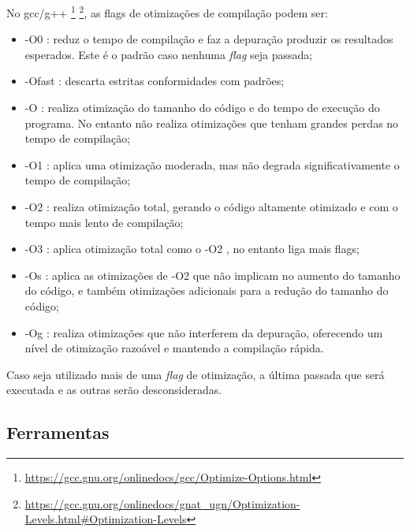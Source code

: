No gcc/g++
\footnote{\url{https://gcc.gnu.org/onlinedocs/gcc/Optimize-Options.html}}
\footnote{\url{https://gcc.gnu.org/onlinedocs/gnat\_ugn/Optimization-Levels.html\#Optimization-Levels}},
 as flags de otimizações de compilação podem ser:

\begin{itemize}
	\item -O0 : reduz o tempo de compilação e faz a depuração produzir os
 resultados esperados. Este é o padrão caso nenhuma \textit{flag} seja passada;
    \item -Ofast : descarta estritas conformidades com padrões;
    \item -O  : realiza otimização do tamanho do código e do tempo de execução do programa.
No entanto não realiza otimizações que tenham grandes perdas no tempo de compilação;
    \item -O1 :  aplica uma otimização moderada, mas não degrada significativamente
 o tempo de compilação;
    \item -O2 : realiza otimização total, gerando o código altamente otimizado e com o
 tempo mais lento de compilação;
    \item -O3 : aplica otimização total como o -O2 , no entanto liga mais flags;
    \item -Os : aplica as otimizações de -O2 que não implicam no aumento do tamanho do código,
 e também otimizações adicionais para a redução do tamanho do código;
    \item -Og : realiza otimizações  que não interferem da depuração,
 oferecendo um nível de otimização razoável e  mantendo a compilação rápida.
\end{itemize}

Caso seja utilizado mais de uma \textit{flag} de otimização, a última passada que será executada
 e as outras serão desconsideradas.


\subsection{Ferramentas}  \label{ferramentas_de_otimizacao}

